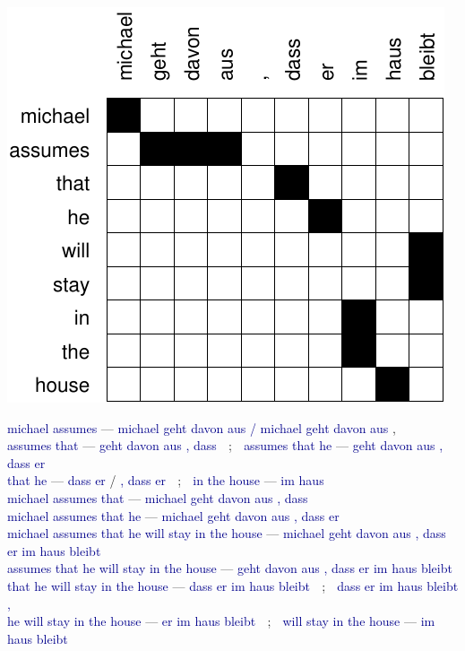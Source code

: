 \documentclass[landscape]{slides}
\newcommand{\example}[1]{\textcolor{darkblue}{\rm #1}}
\begin{document}
\begin{center}
\includegraphics[scale=1]{michael-alignment.pdf}

{\footnotesize 
\example{michael assumes} --- \example{michael geht davon aus / michael geht davon aus} , \\
\example{assumes that} --- \example{geht davon aus , dass} $\;$ ; $\;$ \example{assumes that he} --- \example{geht davon aus , dass er} \\
\example{that he} --- \example{dass er} / \example{, dass er} $\;$ ; $\;$
\example{in the house} --- \example{im haus} \\
\example{michael assumes that} --- \example{michael geht davon aus , dass} \\
\example{michael assumes that he} --- \example{michael geht davon aus , dass er } \\
\example{michael assumes that he will stay in the house } --- \example{michael geht davon aus , dass er im haus bleibt} \\
\example{assumes that he will stay in the house} --- \example{geht davon aus , dass er im haus bleibt} \\
\example{that he will stay in the house} --- \example{dass er im haus bleibt} $\;$ ; $\;$ \example{dass er im haus bleibt ,} \\
\example{he will stay in the house} --- \example{er im haus bleibt}  $\;$ ; $\;$ 
\example{will stay in the house} --- \example{im haus bleibt} \\
}
\end{center}
\end{document}
